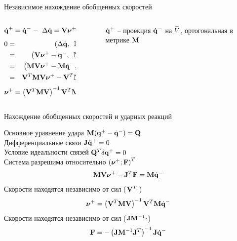 \documentclass{beamer}
\begin{document}
\begin{frame}{Независимое нахождение обобщенных скоростей}
    \begin{columns}
        \hspace{15pt}
        \begin{column}{0.35\textwidth}
            $$ \dqposle = \dqdo -\ \deltadq = \mathbf{V}\nuposle \in \subspace $$
            \begin{eqnarray*}
                0 & = & \dotp{\deltadq}{\mke\cstr} \\
                  & = & \dotp{\cstr\nuposle - \dqdo}{\mke\cstr} \\
                  & = & \dotp{\mke\cstr\nuposle - \mke\dqdo}{\cstr} \\
                  & = & \cstr^T\mke\cstr\nuposle - \cstr^T\mke\dqdo
            \end{eqnarray*}
            \vspace{0.35pt}
            $$ \eqnuposleproj $$
        \end{column}
        \hspace{55pt}
        \begin{column}{0.65\textwidth}
            \begin{figure}
                \hspace{-65pt}
                \caption{
                    $\dqposle$ -- проекция $\dqdo$ на $\subspace$,\newline
                    ортогональная в метрике $\mke$
                }
            \end{figure}
        \end{column}
    \end{columns}
\end{frame}

\begin{frame}{Нахождение обобщенных скоростей и ударных реакций}
    
    Основное уравнение удара  \quad \quad \quad \quad $ \eqDeltaqQ $ \\
    Дифференциальные связи  \quad \quad \quad \quad $ \J\dqposle = 0 $ \\
    Условие идеальности связей \quad \quad \quad $ \Q^T\delta\qposle = 0 $ \\

    Система разрешима относительно $\nuFT$
    $$ \eqMVnuJtF $$
    Скорости находятся независимо от сил ($\cstr^T\cdot$)    
    $$ \eqnuposleproj $$
    Скорости находятся независимо от сил ($\J\mke^{-1}\cdot$)    
    $$ \eqFproj $$
    
\end{frame}
\end{document}

